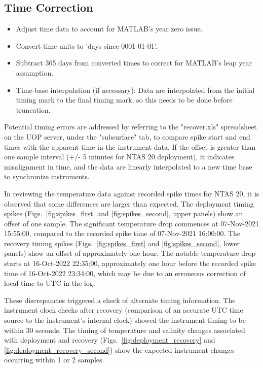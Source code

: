 \documentclass[11pt]{article}
\newcommand{\projectname}{NTAS}  %
\newcommand{\casenumber}{20}  %
\newcommand{\DeploymentSpike}{07-Nov-2021 15:55:00} %
\newcommand{\DeploymentRecordedSpike}{07-Nov-2021 16:00:00}  %
\newcommand{\RecoverySpike}{16-Oct-2022 22:35:00} %
\newcommand{\RecoveryRecordedSpike}{16-Oct-2022 23:34:00} %
\begin{document}
\subsection{Time Correction}
\begin{itemize}
\item Adjust time data to account for MATLAB's year zero issue.
\item Convert time units to 'days since 0001-01-01'.
\item Subtract 365 days from converted times to correct for MATLAB's leap year assumption.
\item Time-base interpolation (if necessary): Data are interpolated from the initial timing mark to the final timing mark, 
so this needs to be done before truncation.
\end{itemize}

Potential timing errors are addressed by referring to the "recover.xls" spreadsheet on the UOP server, 
under the "subsurface" tab, to compare spike start and end times with the apparent time in the instrument data. 
If the offset is greater than one sample interval (+/- 5 minutes for NTAS 20 deployment), 
it indicates misalignment in time, and the data are linearly interpolated to a new time base to synchronize instruments.


In reviewing the temperature data against recorded spike times for \projectname{} \casenumber{}, it is observed
that some differences are larger than expected. The deployment timing spikes
(Figs.~\ref{fig:spikes_first} and \ref{fig:spikes_second}, upper panels) show an offset of one sample.
The significant temperature drop commences at \DeploymentSpike{}, compared to the recorded spike time of
\DeploymentRecordedSpike{}. The recovery timing spikes (Figs.~\ref{fig:spikes_first} and \ref{fig:spikes_second},
lower panels) show an offset of approximately one hour. The notable temperature drop starts at \RecoverySpike{},
approximately one hour before the recorded spike time of \RecoveryRecordedSpike{}, which may be due to an
erroneous correction of local time to UTC in the log.

These discrepancies triggered a check of alternate timing information. The instrument clock checks after
recovery (comparison of an accurate UTC time source to the instrument's internal clock) showed the instrument
timing to be within 30 seconds. The timing of temperature and salinity changes associated with deployment
and recovery (Figs.~\ref{fig:deployment_recovery} and \ref{fig:deployment_recovery_second}) show the expected
instrument changes occurring within 1 or 2 samples.
\end{document}
